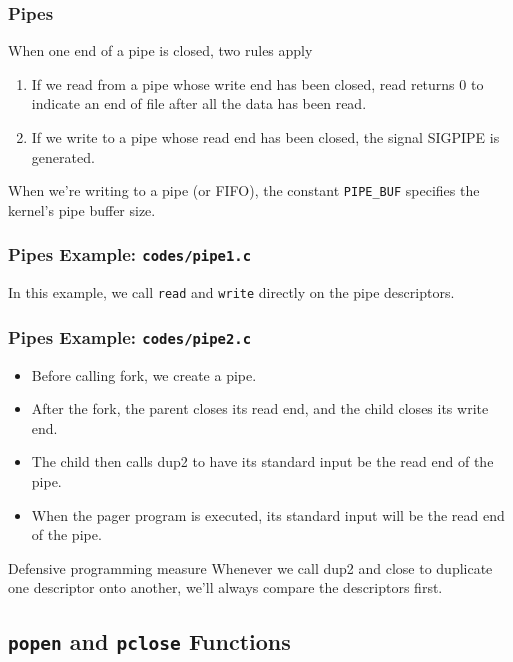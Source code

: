 \documentclass[newPxFont,sthlmFooter,nooffset]{beamer}
\begin{document}
\begin{frame}[t]
  \frametitle{Pipes}
When one end of a pipe is closed, two rules apply
\begin{enumerate}
\item If we read from a pipe whose write end has been closed, read returns 0 to indicate an end of file after all the data has been read.
\item If we write to a pipe whose read end has been closed, the signal SIGPIPE is generated.
\end{enumerate}

When we’re writing to a pipe (or FIFO), the constant \texttt{PIPE\_BUF} specifies the kernel’s pipe buffer size. 
\end{frame}



\begin{frame}
  \frametitle{Pipes Example: \texttt{codes/pipe1.c}}
In this example, we call \texttt{read} and \texttt{write} directly on the pipe descriptors. 

  
\end{frame}



\begin{frame}
  \frametitle{Pipes Example: \texttt{codes/pipe2.c}}

  \begin{itemize}
  \item Before calling fork, we create a pipe.
  \item After the fork, the parent closes its read end, and the child
    closes its write end.
  \item The child then calls dup2 to have its
    standard input be the read end of the pipe.
  \item When the pager program
    is executed, its standard input will be the read end of the pipe.
  \end{itemize}


  

\begin{block}{Defensive programming measure}
Whenever we call dup2 and close to duplicate one descriptor onto another, we’ll always compare the descriptors first.
\end{block}
\end{frame}

\subsection{\texttt{popen} and \texttt{pclose} Functions}
\end{document}
